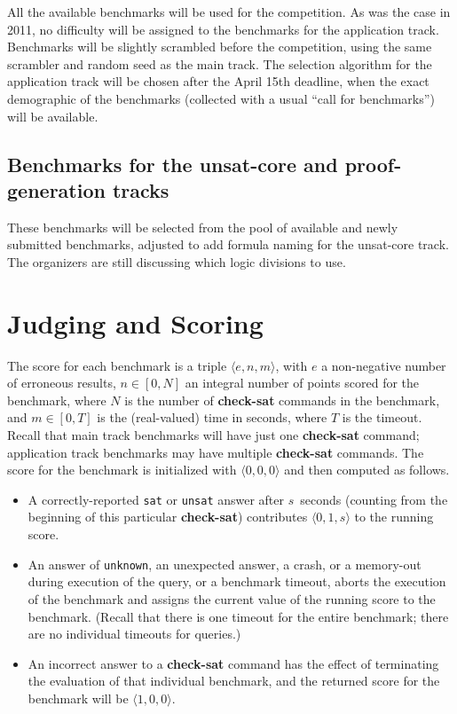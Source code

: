 \documentclass[12pt]{article}
\newcommand{\akey}[1]{\textbf{#1}}
\begin{document}
All the available benchmarks will be used for the competition. 
As was the case in 2011, no difficulty will be assigned to the benchmarks for the application track.
Benchmarks will be slightly scrambled before the competition, using the same scrambler and 
random seed as the main track. 
The selection algorithm for the application track will be chosen after the
 April 15th deadline, when the exact demographic of the benchmarks (collected with a usual
``call for benchmarks'') will be available.

\subsection{Benchmarks for the unsat-core and proof-generation tracks}

These benchmarks will be selected from the pool of available and newly submitted benchmarks,
adjusted to add formula naming for the unsat-core track. The organizers are still discussing
which logic divisions to use.

\section{Judging and Scoring}
\label{sec:judging}

The score for each benchmark is a triple $\langle e,n,m\rangle$, with
$e$ a non-negative number of erroneous results,
$n\in[0,N]$ an integral number of points scored for the benchmark,
where $N$ is the number of \akey{check-sat} commands
in the benchmark, and $m\in[0,T]$ is the (real-valued) time in seconds, where $T$ is
the timeout.  Recall that main track benchmarks will have just one \akey{check-sat} command;
application track benchmarks may have multiple \akey{check-sat} commands.
The score for the benchmark is initialized with
$\langle0,0,0\rangle$ and then computed as follows.
\begin{itemize}
\item A correctly-reported \texttt{sat} or \texttt{unsat} answer after
  $s$~seconds (counting from the beginning of this particular
  \akey{check-sat}) contributes $\langle0,1,s\rangle$ to the running
  score.
\item An answer of \texttt{unknown}, an unexpected answer, a crash, or a memory-out during
  execution of the query, or a benchmark timeout, aborts the execution
  of the benchmark and assigns the current value of the running score
  to the benchmark.  (Recall that there is one timeout for the entire
  benchmark; there are no individual timeouts for queries.)
\item An incorrect answer to a \akey{check-sat} command has the effect of terminating the
  evaluation of that individual benchmark, and the returned score for the benchmark
  will be $\langle1,0,0\rangle$.
\end{itemize}
\end{document}
